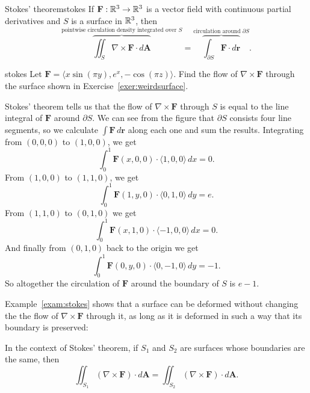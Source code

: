 \documentclass[svgnames]{watsonbook}
\begin{document}
\begin{theo}{Stokes' theorem}{stokes}
  If $\mathbf{F} : \mathbb{R}^3 \to \mathbb{R}^3$ is a vector field with continuous
  partial derivatives and $S$ is a surface in $\mathbb{R}^3$, then
  \[
    \overbrace{\iint_S \nabla \times \mathbf{F} \cdot
      d\mathbf{A}}^{\text{pointwise circulation density integrated
        over $S$}} =
    \overbrace{\int_{\partial S} \mathbf{F} \cdot
      d\mathbf{r}}^{\text{circulation around $\partial S$}}. 
  \]
\end{theo}

\begin{example}{}{stokes}
  Let $\mathbf{F} = \langle x \sin (\pi y), e^x, -\cos(\pi z)
  \rangle$. Find the flow of $\nabla \times \mathbf{F}$ through the
  surface shown in Exercise~\ref{exer:weirdsurface}.
\end{example}

\begin{solution} 
  Stokes' theorem tells us that the flow of $\nabla \times \mathbf{F}$
  through $S$ is equal to the line integral of $\mathbf{F}$ around
  $\partial S$. We can see from the figure that $\partial S$ consists
  four line segments, so we calculate $\int \mathbf{F} \, d\mathbf{r}$
  along each one and sum the results. Integrating from $(0,0,0)$ to
  $(1,0,0)$, we get
  \[
    \int_0^1\mathbf{F}(x,0,0) \cdot \langle 1, 0, 0 \rangle  \, dx =
    0. 
  \]
  From $(1,0,0)$ to $(1,1,0)$, we get
  \[
    \int_0^1\mathbf{F}(1,y,0) \cdot \langle 0, 1, 0 \rangle  \, dy =
    e. 
  \]
  From $(1,1,0)$ to $(0,1,0)$ we get
  \[
    \int_0^1\mathbf{F}(x,1,0) \cdot \langle -1, 0, 0 \rangle  \, dx = 0. 
  \]
  And finally from $(0,1,0)$ back to the origin we get
  \[
    \int_0^1\mathbf{F}(0,y,0) \cdot \langle 0, -1, 0 \rangle  \, dy = -1. 
  \]
  So altogether the circulation of $\mathbf{F}$ around the boundary of
  $S$ is $\boxed{e-1}$. 
\end{solution}

Example~\ref{exam:stokes} shows that a surface can be deformed without
changing the the flow of $\nabla \times \mathbf{F}$ through it, as
long as it is deformed in such a way that its boundary is preserved: 

\begin{obs}{}{}
  In the context of Stokes' theorem, if $S_1$ and $S_2$ are surfaces
  whose boundaries are the same, then
  \[
    \iint_{S_1} (\nabla \times \mathbf{F}) \cdot d\mathbf{A} =
  \iint_{S_2}
  (\nabla \times \mathbf{F})
  \cdot d\mathbf{A}. 
\]
\end{obs}
\end{document}
